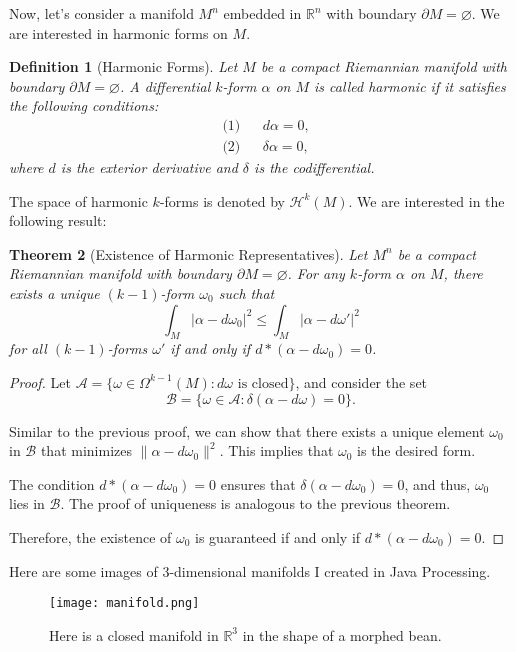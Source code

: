 \documentclass[12pt]{article}
\newtheorem{theorem}{Theorem}[section]
\newtheorem{definition}[theorem]{Definition}
\begin{document}
Now, let's consider a manifold $M^n$ embedded in $\mathbb{R}^n$ with boundary $\partial M = \varnothing$. We are interested in harmonic forms on $M$.

\begin{definition}[Harmonic Forms]
Let $M$ be a compact Riemannian manifold with boundary $\partial M = \varnothing$. A differential $k$-form $\alpha$ on $M$ is called \textit{harmonic} if it satisfies the following conditions:
\[
\begin{aligned}
    &\text{(1)} && d\alpha = 0, \\
    &\text{(2)} && \delta\alpha = 0,
\end{aligned}
\]
where $d$ is the exterior derivative and $\delta$ is the codifferential.
\end{definition}

The space of harmonic $k$-forms is denoted by $\mathcal{H}^k(M)$. We are interested in the following result:

\begin{theorem}[Existence of Harmonic Representatives]
Let $M^n$ be a compact Riemannian manifold with boundary $\partial M = \varnothing$. For any $k$-form $\alpha$ on $M$, there exists a unique $(k-1)$-form $\omega_0$ such that
\[
\int_M |\alpha - d\omega_0|^2 \leq \int_M |\alpha - d\omega'|^2
\]
for all $(k-1)$-forms $\omega'$ if and only if $d\ast(\alpha - d\omega_0) = 0$.
\end{theorem}

\begin{proof}
Let $\mathcal{A} = \{\omega \in \Omega^{k-1}(M) : d\omega \text{ is closed}\}$, and consider the set
\[
\mathcal{B} = \{\omega \in \mathcal{A} : \delta(\alpha - d\omega) = 0\}.
\]

Similar to the previous proof, we can show that there exists a unique element $\omega_0$ in $\mathcal{B}$ that minimizes $\|\alpha - d\omega_0\|^2$. This implies that $\omega_0$ is the desired form.

The condition $d\ast(\alpha - d\omega_0) = 0$ ensures that $\delta(\alpha - d\omega_0) = 0$, and thus, $\omega_0$ lies in $\mathcal{B}$. The proof of uniqueness is analogous to the previous theorem.

Therefore, the existence of $\omega_0$ is guaranteed if and only if $d\ast(\alpha - d\omega_0) = 0$.
\end{proof}

Here are some images of 3-dimensional manifolds I created in Java Processing.

\begin{figure}[ht]
    \centering
    \texttt{[image: manifold.png]}
    \caption{Here is a closed manifold in $\mathbb{R}^{3}$ in the shape of a morphed bean.}
\end{figure}
\end{document}
